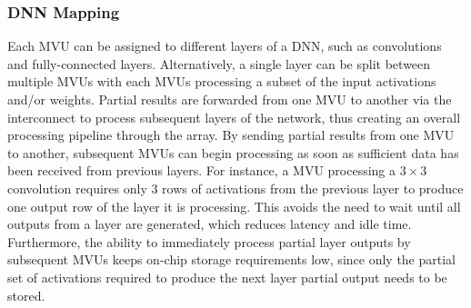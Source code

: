 \documentclass[sigconf]{acmart}
\newcommand{\MVU}{MVU}
\begin{document}
\subsubsection{DNN Mapping}

Each \MVU{} can be assigned to different layers of a DNN, such as convolutions and fully-connected layers. 
Alternatively, a single layer can be split between multiple \MVU{}s with each \MVU{}s processing a subset of the input activations and/or weights. Partial results are forwarded from one \MVU{} to another via the interconnect to process subsequent layers of the network, thus creating an overall processing pipeline through the array. By sending partial results from one \MVU{} to another, subsequent \MVU{}s can begin processing as soon as sufficient data has been received from previous layers. For instance, a \MVU{} processing a $3\times3$ convolution requires only 3 rows of  activations from the previous layer to produce one output row of the layer it is processing. This avoids the need to wait until all outputs from a layer are generated, which reduces latency and idle time. Furthermore, the ability to immediately process partial layer outputs by subsequent \MVU{}s keeps on-chip storage requirements low, since only the partial set of activations required to produce the next layer partial output needs to be stored.
\end{document}
